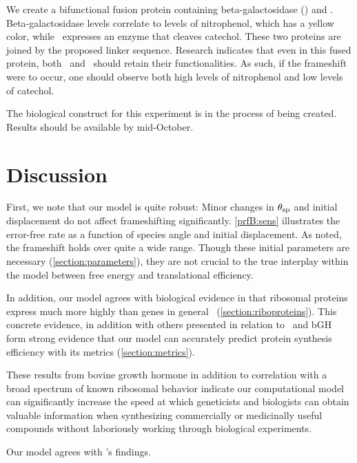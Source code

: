 \documentclass[12pt]{article}
\numberwithin{equation}{section}
\begin{document}
We create a bifunctional fusion protein containing beta-galactosidase (\bgals) 
and \xylE.  Beta-galactosidase levels correlate to
levels of nitrophenol, which has a yellow color, while \xylE\ expresses
an enzyme that cleaves catechol.  These two proteins are joined by
the proposed linker sequence.  Research indicates that even in this
fused protein, both \bgals\ and \xylE\ should retain their functionalities.
As such, if the frameshift were to occur, one should observe both 
high levels of nitrophenol and low levels of catechol.

The biological construct for this experiment is in the process of being created.
Results should be available by mid-October.

\section{Discussion}
First, we note that our model is quite robust: Minor changes
in $\theta_{\rm{sp}}$ and initial displacement do not affect
frameshifting significantly.
\autoref{prfB:sens} illustrates the error-free rate as
a function of species angle and initial displacement. As noted,
the frameshift holds over quite a wide range. Though these initial
parameters are necessary (\autoref{section:parameters}), they are not
crucial to the true interplay within the model between free energy and
translational efficiency.

In addition, our model agrees with biological evidence in that
ribosomal proteins express much more highly than genes in
general~\cite{rpoS:process} (\autoref{section:riboproteins}). This
concrete evidence, in addition with others presented in relation to
\prfB\ and bGH form strong evidence that our model can accurately
predict protein synthesis efficiency with its metrics (\autoref{section:metrics}).

These results from bovine growth hormone in addition to correlation with a broad
spectrum of known ribosomal behavior indicate our computational model
can significantly increase the speed at which geneticists and
biologists can obtain valuable information when synthesizing
commercially or medicinally useful compounds without laboriously
working through biological experiments.

Our model agrees with \citeauthor{schoner:bgh}'s findings.

{}
\begin{singlespace}  \end{singlespace}
\end{document}

